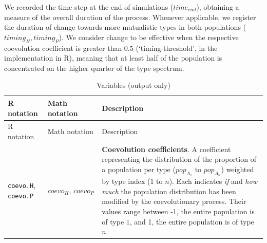 \documentclass[
]{book}
\begin{document}
We recorded the time step at the end of simulations (\(time_{end}\)), obtaining a measure of the overall duration of the process. Whenever applicable, we register the duration of change towards more mutualistic types in both populations (\(timing_H, timing_P\)). We consider change to be effective when the respective coevolution coefficient is greater than 0.5 (`timing-threshold', in the implementation in R), meaning that at least half of the population is concentrated on the higher quarter of the type spectrum.

\begin{longtable}[]{@{}lll@{}}
\caption{Variables (output only)}\tabularnewline
\toprule
\begin{minipage}[b]{0.36\columnwidth}\raggedright
R notation\strut
\end{minipage} & \begin{minipage}[b]{0.21\columnwidth}\raggedright
Math notation\strut
\end{minipage} & \begin{minipage}[b]{0.34\columnwidth}\raggedright
Description\strut
\end{minipage}\tabularnewline
\midrule
\endfirsthead
\toprule
\begin{minipage}[b]{0.36\columnwidth}\raggedright
R notation\strut
\end{minipage} & \begin{minipage}[b]{0.21\columnwidth}\raggedright
Math notation\strut
\end{minipage} & \begin{minipage}[b]{0.34\columnwidth}\raggedright
Description\strut
\end{minipage}\tabularnewline
\midrule
\endhead
\begin{minipage}[t]{0.36\columnwidth}\raggedright
\texttt{coevo.H}, \texttt{coevo.P}\strut
\end{minipage} & \begin{minipage}[t]{0.21\columnwidth}\raggedright
\(coevo_{H},\,coevo_{P}\)\strut
\end{minipage} & \begin{minipage}[t]{0.34\columnwidth}\raggedright
\textbf{Coevolution coefficients}. A coefficient representing the distribution of the proportion of a population per type (\(pop_{A_1}\) to \(pop_{A_n}\)) weighted by type index (\(1\) to \(n\)). Each indicates \emph{if} and \emph{how much} the population distribution has been modified by the coevolutionary process. Their values range between -1, the entire population is of type \(1\), and 1, the entire population is of type \(n\).\strut

\end{minipage}
\end{longtable}
\end{document}
